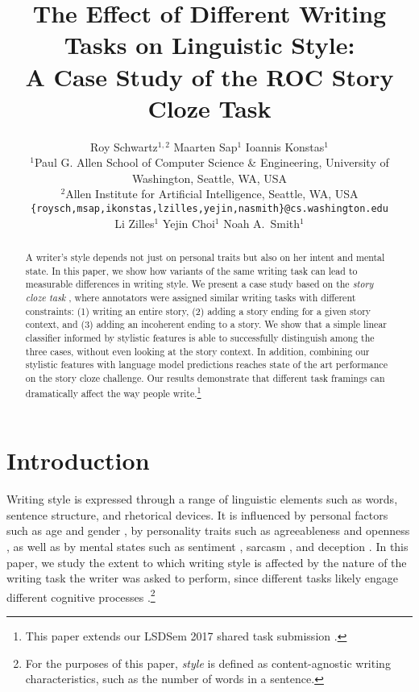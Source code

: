 \documentclass[11pt,a4paper]{article}
\title{The Effect of Different Writing Tasks on Linguistic Style:\\ A Case Study of the ROC Story Cloze Task}
\author{\hspace{2cm}Roy Schwartz$^{1,2}$ \And \hspace{2.5cm}Maarten Sap$^1$ \And \hspace{3cm}Ioannis Konstas$^1$ \And \\
  $^1$Paul G. Allen School of Computer Science \& Engineering,
  University of Washington, Seattle, WA, USA \\
  $^2$Allen Institute for Artificial Intelligence, Seattle, WA, USA\\
    {\tt \{roysch,msap,ikonstas,lzilles,yejin,nasmith\}@cs.washington.edu}  \\
    \And \hspace{-2cm}Li Zilles$^1$ \And \hspace{-2.5cm}Yejin Choi$^1$ \And \hspace{-2.5cm}Noah A.~Smith$^1$ \\
  }
\date{}
\newcommand{\nascomment}[1]{{\color{blue}\textsc{[#1 --nas]}}}
\begin{document}
\maketitle
\begin{abstract}
A writer's style depends not just on personal traits but also on her intent and mental state.
In this paper, we show how variants of the same writing task can lead to measurable differences in writing style.
We present a case study based on 
the  {\it story cloze task} \cite{Mostafazadeh:2016},
where annotators were assigned similar writing tasks with different constraints: (1) writing an entire story, (2) adding a story ending for a given story context, and (3) adding an incoherent ending to a story.
We show that a simple linear classifier informed by stylistic features is able to successfully distinguish among the three cases, without even looking at the story context.
In addition, %
combining our stylistic features with language model predictions reaches state of the art performance on the story cloze challenge.
Our results demonstrate that different task framings can dramatically affect the way people write.\footnote{This paper extends our LSDSem 2017 shared task submission \cite{Schwartz:2017b}.}


\end{abstract}

\section{Introduction}
Writing style is expressed through a range of linguistic elements such as words, sentence structure, and rhetorical devices.
It is influenced by personal factors such as age and gender \cite{Schler:2006}, 
by personality traits such as agreeableness and openness  \cite{Ireland:2014b},
as well as by mental states such as sentiment \cite{Davidov:2010}, sarcasm \cite{Tsur:2010}, and deception \cite{Feng:2012}.  
In this paper, we study the extent to which writing style is affected by the nature of the writing task the writer was asked to perform, since
different tasks likely engage different cognitive processes \cite{Campbell:2003,Banerjee:2014}.\footnote{For the purposes of this paper, \emph{style} is defined as content-agnostic writing characteristics, such as the number of words in a sentence.}
\end{document}

